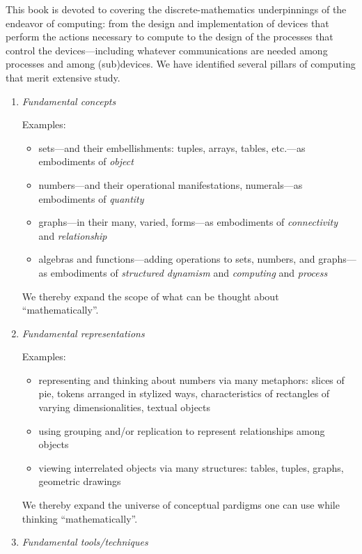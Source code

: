 This book is devoted to covering the discrete-mathematics
underpinnings of the endeavor of computing: from the design and
implementation of devices that perform the actions necessary to
compute to the design of the processes that control the
devices---including whatever communications are needed among processes
and among (sub)devices.  We have identified several pillars of
computing that merit extensive study.
\begin{enumerate}
\item
{\it Fundamental concepts}

\medskip

{\small\sf Examples:}
\begin{itemize}
\item%
sets---and their embellishments: tuples, arrays, tables, etc.---as
embodiments of {\it object}
\item
numbers---and their operational manifestations, numerals---as
embodiments of {\it quantity}
\item
graphs---in their many, varied, forms---as embodiments of {\it
  connectivity} and {\it relationship}
\item
algebras and functions---adding operations to sets, numbers, and
graphs---as embodiments of {\it structured dynamism} and {\it
  computing} and {\it process}
\end{itemize}
We thereby expand the scope of what can be thought about
``mathematically''.

\medskip

\item
{\it Fundamental representations}

\medskip

{\small\sf Examples:}
\begin{itemize}
\item
representing and thinking about numbers via many metaphors: slices of
pie, tokens arranged in stylized ways, characteristics of rectangles
of varying dimensionalities, textual objects
\item
using grouping and/or replication to represent relationships among
objects
\item
viewing interrelated objects via many structures: tables, tuples,
graphs, geometric drawings
\end{itemize}
We thereby expand the universe of conceptual pardigms one can use
while thinking ``mathematically''.

\medskip

\item
{\it Fundamental tools/techniques}


\end{enumerate}
